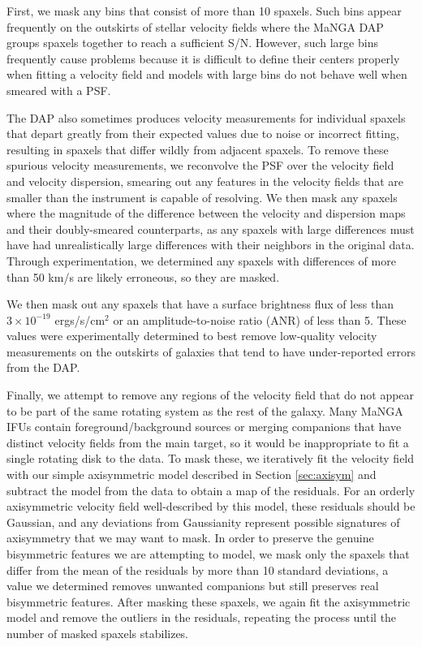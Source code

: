 First, we mask any bins that consist of more than 10 spaxels. Such bins appear frequently on the outskirts of stellar velocity fields where the MaNGA DAP groups spaxels together to reach a sufficient S/N. However, such large bins frequently cause problems because it is difficult to define their centers properly when fitting a velocity field and models with large bins do not behave well when smeared with a PSF. 

The DAP also sometimes produces velocity measurements for individual spaxels that depart greatly from their expected values due to noise or incorrect fitting, resulting in spaxels that differ wildly from adjacent spaxels. To remove these spurious velocity measurements, we reconvolve the PSF over the velocity field and velocity dispersion, smearing out any features in the velocity fields that are smaller than the instrument is capable of resolving. We then mask any spaxels where the magnitude of the difference between the velocity and dispersion maps and their doubly-smeared counterparts, as any spaxels with large differences must have had unrealistically large differences with their neighbors in the original data. Through experimentation, we determined any spaxels with differences of more than 50 km/s are likely erroneous, so they are masked.

We then mask out any spaxels that have a surface brightness flux of less than $3 \times 10^{-19}$ ergs/s/cm$^2$ or an amplitude-to-noise ratio (ANR) of less than 5. These values were experimentally determined to best remove low-quality velocity measurements on the outskirts of galaxies that tend to have under-reported errors from the DAP.

Finally, we attempt to remove any regions of the velocity field that do not appear to be part of the same rotating system as the rest of the galaxy. Many MaNGA IFUs contain foreground/background sources or merging companions that have distinct velocity fields from the main target, so it would be inappropriate to fit a single rotating disk to the data. To mask these, we iteratively fit the velocity field with our simple axisymmetric model described in Section \ref{sec:axisym} and subtract the model from the data to obtain a map of the residuals. For an orderly axisymmetric velocity field well-described by this model, these residuals should be Gaussian, and any deviations from Gaussianity represent possible signatures of axisymmetry that we may want to mask. In order to preserve the genuine bisymmetric features we are attempting to model, we mask only the spaxels that differ from the mean of the residuals by more than 10 standard deviations, a value we determined removes unwanted companions but still preserves real bisymmetric features. After masking these spaxels, we again fit the axisymmetric model and remove the outliers in the residuals, repeating the process until the number of masked spaxels stabilizes.

